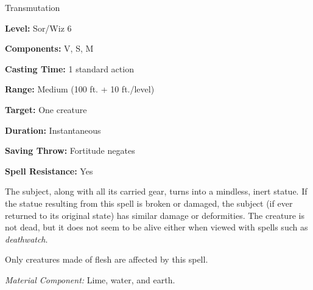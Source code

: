 
Transmutation

\textbf{Level:} Sor/Wiz 6

\textbf{Components:} V, S, M

\textbf{Casting Time:} 1 standard action

\textbf{Range:} Medium (100 ft. + 10 ft./level)

\textbf{Target:} One creature

\textbf{Duration:} Instantaneous

\textbf{Saving Throw:} Fortitude negates

\textbf{Spell Resistance:} Yes

The subject, along with all its carried gear, turns into a mindless, inert statue. 
If the statue resulting from this spell is broken or damaged, the subject (if ever 
returned to its original state) has similar damage or deformities. The creature 
is not dead, but it does not seem to be alive either when viewed with spells such 
as \textit{deathwatch}.

Only creatures made of flesh are affected by this spell.

\textit{Material Component:} Lime, water, and earth.

